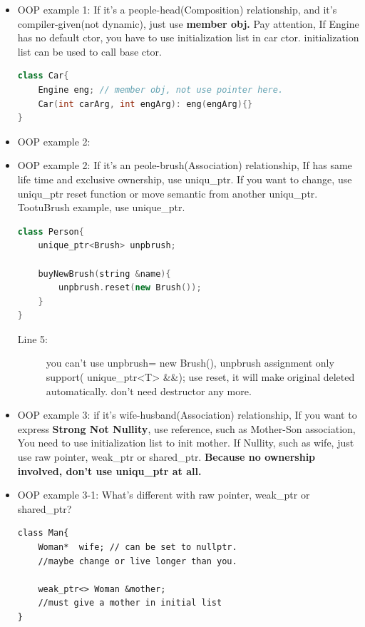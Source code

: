\documentclass[a4paper,11pt,twoside]{book}
\begin{document}
\begin{itemize}
	\item OOP example 1: If it's a people-head(Composition) relationship, and it's compiler-given(not dynamic), just use \textbf{member obj.}   Pay attention, If Engine has no default ctor, you have to use initialization list in car ctor.  initialization list can be used to call base ctor.
\begin{lstlisting}[frame=single, language=c++]
class Car{
	Engine eng; // member obj, not use pointer here.
	Car(int carArg, int engArg): eng(engArg){}
}
	\end{lstlisting}
	
	\item OOP example 2: 
	
	\item OOP example 2:  If it's an peole-brush(Association) relationship, If has same life time and exclusive ownership, use uniqu\_ptr. If you want to change, use uniqu\_ptr reset function or move semantic from another uniqu\_ptr.   TootuBrush example, use unique\_ptr.
\begin{lstlisting}[frame=single, language=c++]
class Person{
	unique_ptr<Brush> unpbrush;
	
	buyNewBrush(string &name){
		unpbrush.reset(new Brush());
	}
}
\end{lstlisting}
\begin{description}
	\item[Line 5:] you can't use unpbrush= new Brush(), unpbrush assignment only support( unique\_ptr<T> \&\&); use reset, it will make original deleted automatically. don't need destructor any more.
\end{description}
	
	\item OOP example 3: if it's wife-husband(Association) relationship, If you want to express \textbf{Strong Not Nullity}, use reference, such as Mother-Son association, You need to use initialization list to init mother. If Nullity, such as wife, just use raw pointer, weak\_ptr or shared\_ptr. \textbf{Because no ownership involved, don't use uniqu\_ptr at all. }
	
	\item OOP example 3-1: What's different with raw pointer, weak\_ptr or shared\_ptr?
	\begin{lstlisting}[numbers=none]
class Man{
	Woman*  wife; // can be set to nullptr.
	//maybe change or live longer than you.
	
	weak_ptr<> Woman &mother; 
	//must give a mother in initial list
}
\end{lstlisting}
	

\end{itemize}
\end{document}

